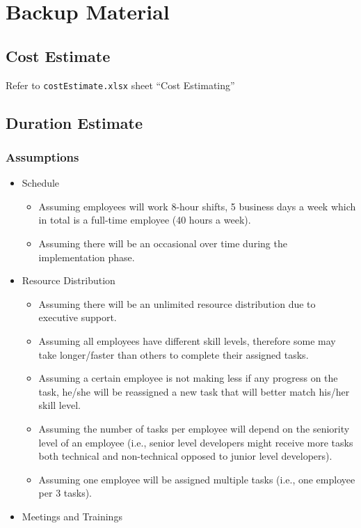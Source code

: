 \documentclass{article}
\begin{document}
\section{Backup Material}
\subsection{Cost Estimate}
Refer to \texttt{costEstimate.xlsx} sheet ``Cost Estimating''

\subsection{Duration Estimate}
\subsubsection{Assumptions}
\begin{itemize}
\item Schedule
  \begin{itemize}
  \item Assuming employees will work 8-hour shifts, 5 business days a week which in total is a full-time employee (40 hours a week).
  \item Assuming there will be an occasional over time during the implementation phase.
  \end{itemize}
\item Resource Distribution
  \begin{itemize}
  \item Assuming there will be an unlimited resource distribution due to executive support.
  \item Assuming all employees have different skill levels, therefore some may take longer/faster than others to complete their assigned tasks.
  \item Assuming a certain employee is not making less if any progress on the task, he/she will be reassigned a new task that will better match his/her skill level.
  \item Assuming the number of tasks per employee will depend on the seniority level of an employee (i.e., senior level developers might receive more tasks both technical and non-technical opposed to junior level developers).
  \item Assuming one employee will be assigned multiple tasks (i.e., one employee per 3 tasks).
  \end{itemize}
\item Meetings and Trainings
  \begin{itemize}

\end{itemize}
\end{itemize}
\end{document}

